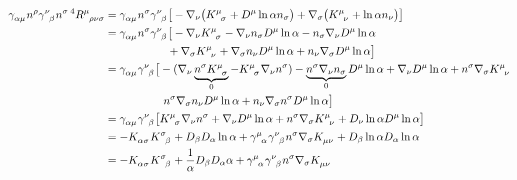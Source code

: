 \documentclass[12pt]{article}
\numberwithin{equation}{section}
\numberwithin{theorem}{subsection}
\begin{document}
\begin{align}

   \tensor{\gamma}{_\alpha_\mu}n^{\rho}\tensor{\gamma}{^\nu_\beta}n^{\sigma} \, ^{4}\tensor{R}{^\mu_\rho_\nu_\sigma} &= \tensor{\gamma}{_\alpha_\mu}n^{\sigma}\tensor{\gamma}{^\nu_\beta} \big[-\nabla_{\nu}\big(\tensor{K}{^\mu_\sigma}+D^{\mu}\ln{\alpha}n_{\sigma}\big)+\nabla_{\sigma}\big(\tensor{K}{^\mu_\nu}+\ln{\alpha}n_{\nu} \big)\big] \notag \\

   &= \tensor{\gamma}{_\alpha_\mu}n^{\sigma}\tensor{\gamma}{^\nu_\beta}  \big[ -\nabla_{\nu}\tensor{K}{^\mu_\sigma}-\nabla_{\nu}n_{\sigma}D^{\mu}\ln{\alpha}-n_{\sigma}\nabla_{\nu}D^{\mu}\ln{\alpha} \notag \\

   &\;\;\;\;\;\!\!\!\;\;\;\;\;\;\;\;\;\;\;\;\;\;\;\;\;+\nabla_{\sigma}\tensor{K}{^\mu_\nu}+\nabla_{\sigma}n_{\nu}D^{\mu}\ln{\alpha}+n_{\nu}\nabla_{\sigma}D^{\mu}\ln{\alpha} \big] \\

   &= \tensor{\gamma}{_\alpha_\mu}\tensor{\gamma}{^\nu_\beta}\big[-(\nabla_{\nu}\underbrace{n^{\sigma}\tensor{K}{^\mu_\sigma}}_{0}-\tensor{K}{^\mu_\sigma}\nabla_{\nu}n^{\sigma}) - \underbrace{n^{\sigma}\nabla_{\nu}n_{\sigma}}_{0}D^{\mu}\ln{\alpha} + \nabla_{\nu}D^{\mu}\ln{\alpha} + n^{\sigma}\nabla_{\sigma}\tensor{K}{^\mu_\nu} \notag \\ &\;\;\;\;\;\;\;\;\;\;\;\;\;\;\;\;\;\;\; n^{\sigma}\nabla_{\sigma}n_{\nu}D^{\mu}\ln{\alpha} + n_{\nu}\nabla_{\sigma}n^{\sigma}D^{\mu}\ln{\alpha} \big] \notag \\

   &= \tensor{\gamma}{_\alpha_\mu}\tensor{\gamma}{^\nu_\beta}\big[\tensor{K}{^\mu_\sigma}\nabla_{\nu}n^{\sigma}+\nabla_{\nu}D^{\mu}\ln{\alpha}+n^{\sigma}\nabla_{\sigma}\tensor{K}{^\mu_\nu}+D_{\nu}\ln{\alpha}D^{\mu}\ln{\alpha} \big] \notag \\ 

   &= -\tensor{K}{_\alpha_\sigma}\tensor{K}{^\sigma_\beta} + D_{\beta}D_{\alpha}\ln{\alpha}+ \tensor{\gamma}{^\mu_\alpha}\tensor{\gamma}{^\nu_\beta}n^{\sigma}\nabla_{\sigma}\tensor{K}{_\mu_\nu}+D_{\beta}\ln{\alpha}D_{\alpha}\ln{\alpha} \notag \\

   &= -\tensor{K}{_\alpha_\sigma}\tensor{K}{^\sigma_\beta}+\frac{1}{\alpha}D_{\beta}D_{\alpha}\alpha+\tensor{\gamma}{^\mu_\alpha}\tensor{\gamma}{^\nu_\beta}n^{\sigma}\nabla_{\sigma}\tensor{K}{_\mu_\nu}

\end{align}
\end{document}
